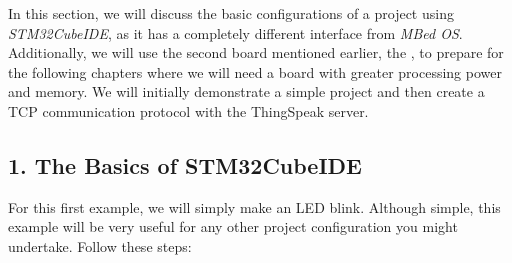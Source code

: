 \documentclass[10pt,a4paper,onecolumn]{article}
\let\textttOrig=\texttt
\def\texttt#1{\expandafter\textttOrig{\seqsplit{#1}}}
\begin{document}
In this section, we will discuss the basic configurations of a project
using \textit{STM32CubeIDE}, as it has a completely different interface from \textit{MBed
OS}. Additionally, we will use the second board mentioned earlier, the
\texttt{B-U585I-IOT02A}, to prepare for the following chapters where we
will need a board with greater processing power and memory. We will
initially demonstrate a simple project and then create a TCP
communication protocol with the ThingSpeak server.

\hypertarget{the-basics-of-STM32CubeIDE}{%
\subsection{1. The Basics of
STM32CubeIDE}\label{the-basics-of-STM32CubeIDE}}

For this first example, we will simply make an LED blink. Although
simple, this example will be very useful for any other project
configuration you might undertake. Follow these steps:
\end{document}

